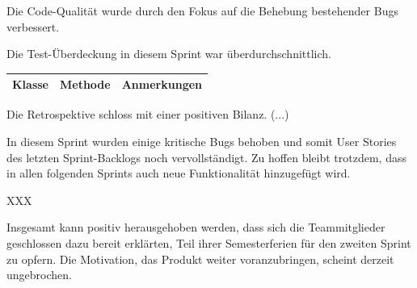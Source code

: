 Die Code-Qualität wurde durch den Fokus auf die Behebung bestehender Bugs verbessert.
\nsecend%

Die Test-Überdeckung in diesem Sprint war überdurchschnittlich.
\nsecend%

\begin{table}[H]

\begin{tabularx}{\textwidth}{ |l|l|X| }
\hline
\textbf{Klasse} & \textbf{Methode} & \textbf{Anmerkungen}\\
 \hline
\hline
\end{tabularx}
\end{table}

\nsecend%

Die Retrospektive schloss mit einer positiven Bilanz. (...)
\nsecend%

In diesem Sprint wurden einige kritische Bugs behoben und somit User Stories des letzten Sprint-Backlogs noch vervollständigt. Zu hoffen bleibt trotzdem, dass in allen folgenden Sprints auch neue Funktionalität hinzugefügt wird.
\nsecend%

XXX
\nsecend%

Insgesamt kann positiv herausgehoben werden, dass sich die Teammitglieder geschlossen dazu bereit erklärten, Teil ihrer Semesterferien für den zweiten Sprint zu opfern. Die Motivation, das Produkt weiter voranzubringen, scheint derzeit ungebrochen.
\nsecend%